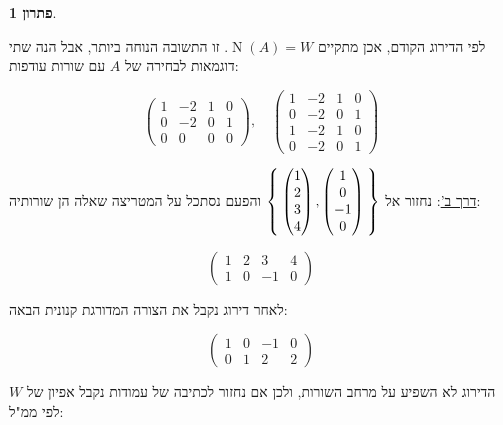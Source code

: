 \documentclass[12pt]{report}
\theoremstyle{plain}
\theoremstyle{definition}
\newtheorem*{solution}{פתרון}
\newcommand{\0}{\mathbf{0}}
\DeclareMathOperator{\Null}{N}
\begin{document}
\begin{solution}
\begin{enumerate}[label=\alph*.]
לפי הדירוג הקודם, אכן מתקיים
$\Null(A)=W$.
זו התשובה הנוחה ביותר, אבל הנה שתי דוגמאות לבחירה של 
$A$
עם שורות עודפות:

$$
\begin{pmatrix}
1 & -2 & 1 & 0 \\
0 & -2 & 0 & 1 \\
0 & 0 & 0 & 0
\end{pmatrix}, \quad \begin{pmatrix}
1 & -2 & 1 & 0 \\
0 & -2 & 0 & 1 \\
1 & -2 & 1 & 0 \\
0 & -2 & 0 & 1
\end{pmatrix}
$$


\underline{דרך ב'}:
נחזור אל 
$\Set{\begin{pmatrix}
1 \\
2 \\
3 \\
4
\end{pmatrix},\begin{pmatrix}
1 \\
0 \\
-1 \\
0
\end{pmatrix}}$
והפעם נסתכל על המטריצה שאלה הן שורותיה:

$$
\begin{pmatrix}
1 & 2 & 3 & 4 \\
1 & 0 &-1 & 0
\end{pmatrix}
$$

לאחר דירוג נקבל את הצורה המדורגת קנונית הבאה:

$$
\begin{pmatrix}
1 & 0 & -1 & 0 \\
0 & 1 & 2 & 2
\end{pmatrix}
$$

הדירוג לא השפיע על מרחב השורות, ולכן אם נחזור לכתיבה של עמודות נקבל אפיון של
$W$
לפי ממ"ל:


\end{enumerate}
\end{solution}
\end{document}
